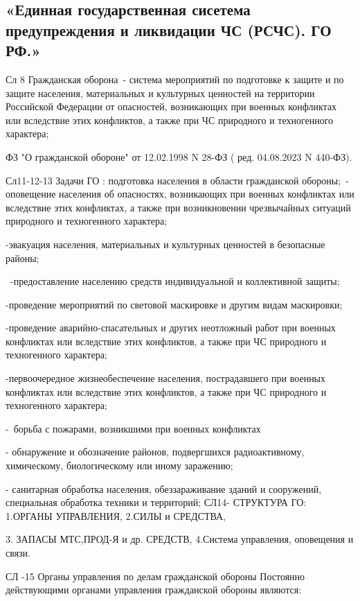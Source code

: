 \documentclass[a4paper, 12pt]{article}
\theoremstyle{definition}
\begin{document}
        \subsection{«Единная государственная сисетема предупреждения и ликвидации ЧС (РСЧС). ГО РФ.»}
        Сл 8 Гражданская оборона - система мероприятий по подготовке к защите и по защите населения, материальных и культурных ценностей на территории Российской Федерации от опасностей, возникающих при военных конфликтах или вследствие этих конфликтов, а также при ЧС природного и техногенного характера;

        ФЗ "О гражданской обороне" от 12.02.1998 N 28-ФЗ ( ред. 04.08.2023 N 440-ФЗ).

        Сл11-12-13  Задачи ГО : подготовка населения в области гражданской обороны; -оповещение населения об опасностях, возникающих при военных конфликтах или вследствие этих конфликтах, а также при возникновении чрезвычайных ситуаций природного и техногенного характера;

        -эвакуация населения, материальных и культурных ценностей в безопасные районы;

         -предоставление населению  средств индивидуальной и коллективной защиты;

        -проведение мероприятий по световой маскировке и другим видам маскировки;

        -проведение аварийно-спасательных и других неотложный работ при военных конфликтах или вследствие этих конфликтов, а также при ЧС природного и техногенного характера;
        
        -первоочередное жизнеобеспечение населения, пострадавшего при военных конфликтах или вследствие этих конфликтов, а также при ЧС природного и техногенного характера;

        - борьба с пожарами, возникшими при военных конфликтах 

        - обнаружение и обозначение районов, подвергшихся радиоактивному, химическому, биологическому или иному заражению;
        
        - санитарная обработка населения, обеззараживание зданий и сооружений, специальная обработка техники и территорий;
        СЛ14- СТРУКТУРА ГО:  1.ОРГАНЫ УПРАВЛЕНИЯ, 2.СИЛЫ  и СРЕДСТВА, 

        3. ЗАПАСЫ МТС,ПРОД-Я и др. СРЕДСТВ, 4.Система управления, оповещения и связи.

        СЛ -15 Органы управления по делам гражданской обороны
        Постоянно действующими органами управления гражданской обороны являются:
\end{document}
